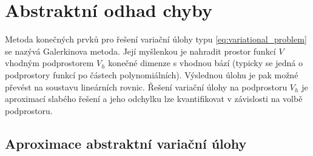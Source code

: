 







\section{Abstraktní odhad chyby}

Metoda konečných prvků pro řešení variační úlohy typu \eqref{eq:variational_problem} se nazývá Galerkinova metoda.
Její myšlenkou je nahradit prostor funkcí $V$ vhodným podprostorem $V_h$ konečné dimenze s vhodnou bází (typicky se jedná o podprostory funkcí po částech polynomiálních).
Výslednou úlohu je pak možné převést na soustavu lineárních rovnic.
Řešení variační úlohy na podprostoru $V_h$ je aproximací slabého řešení a jeho odchylku lze kvantifikovat v závislosti na volbě podprostoru.




\subsection{Aproximace abstraktní variační úlohy}

